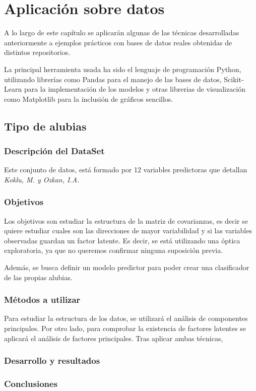 \chapter{Aplicación sobre datos}

\noindent A lo largo de este capítulo se  aplicarán algunas de las técnicas desarrolladas anteriormente a ejemplos prácticos con bases de datos reales obtenidas de distintos repositorios. 

\noindent La principal herramienta usada ha sido el lenguaje de programación Python, utilizando librerías como Pandas para el manejo de las bases de datos, Scikit-Learn para la implementación de los modelos  y otras librerias de visualización como Matplotlib para la inclusión de gráficos sencillos. 

\section{Tipo de alubias}
\subsection*{Descripción del DataSet}
\noindent Este conjunto de datos,  \cite{Alubias} está formado por 12 variables predictoras que detallan \emph{Koklu, M. y Ozkan, I.A.}\cite{Koklu 2020}
\subsection*{Objetivos}
\noindent Los objetivos son estudiar la estructura de la matriz de covarianzas, es decir se quiere estudiar cuales son las direcciones de mayor variabilidad y si las variables observadas guardan un factor latente. Es decir, se está utilizando una óptica exploratoria, ya que no queremos confirmar ninguna suposición previa. 

\noindent Además, se busca definir un modelo predictor para poder crear una clasificador de las propias alubias. 

\subsection*{Métodos a utilizar}
\noindent Para estudiar la estructura de los datos, se utilizará el análisis de componentes principales. Por otro lado, para comprobar la existencia de factores latentes se aplicará el análisis de factores principales. Tras aplicar ambas técnicas,
\subsection*{Desarrollo y resultados}
\subsection*{Conclusiones}

